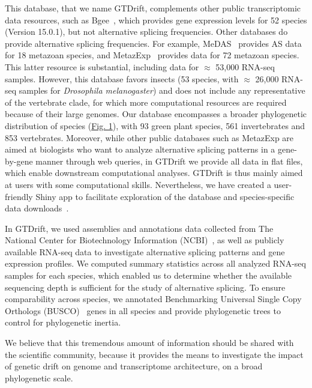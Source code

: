 This database, that we name GTDrift, complements other public transcriptomic data resources, such as Bgee~\citep{bastian_bgee_2020}, which provides gene expression levels for 52 species (Version 15.0.1), but not alternative splicing frequencies. Other databases do provide alternative splicing frequencies. For example, MeDAS~\citep{li_medas_2020} provides \acrshort{AS} data for 18 metazoan species, and MetazExp~\citep{liu_metazexp_2021} provides data for 72 metazoan species. This latter resource is substantial, including data for $\approx$ 53,000 RNA-seq samples. However, this database favors insects (53 species, with $\approx$ 26,000 RNA-seq samples for \textit{Drosophila melanogaster}) and does not include any representative of the vertebrate clade, for which more computational resources are required because of their large genomes. Our database encompasses a broader phylogenetic distribution of species (\hyperref[fig:gtdrift1]{Fig. 1}), with 93 green plant species, 561 invertebrates and 853 vertebrates. Moreover, while other public databases such as MetazExp are aimed at biologists who want to analyze alternative splicing patterns in a gene-by-gene manner through web queries, in GTDrift we provide all data in flat files, which enable downstream computational analyses. GTDrift is thus mainly aimed at users with some computational skills. Nevertheless, we have created a user-friendly Shiny app to facilitate exploration of the database and species-specific data downloads~\citep{chang_shiny_2024}.

In GTDrift, we used assemblies and annotations data collected from The National Center for Biotechnology Information (NCBI)~\citep{sayers_database_2022}, as well as publicly available RNA-seq data to investigate alternative splicing patterns and gene expression profiles. We computed summary statistics across all analyzed RNA-seq samples for each species, which enabled us to determine whether the available sequencing depth is sufficient for the study of alternative splicing.
To ensure comparability across species, we annotated Benchmarking Universal Single Copy Orthologs (\acrshort{BUSCO})~\citep{waterhouse_busco_2018} genes in all species and provide phylogenetic trees to control for phylogenetic inertia.

We believe that this tremendous amount of information should be shared with the scientific community, because it provides the means to investigate the impact of genetic drift on genome and transcriptome architecture, on a broad phylogenetic scale.

